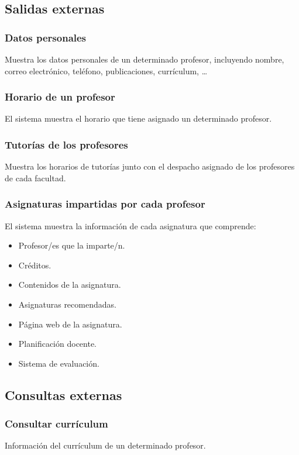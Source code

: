 \documentclass[11pt,a4paper,spanish,twoside]{book}
\begin{document}
\subsection{Salidas externas}
\subsubsection{Datos personales}
Muestra los datos personales de un determinado profesor, incluyendo
nombre, correo electrónico, teléfono, publicaciones, currículum, \dots

\subsubsection{Horario de un profesor}
El sistema muestra el horario que tiene asignado un determinado profesor.

\subsubsection{Tutorías de los profesores} 
Muestra los horarios de tutorías junto con el despacho asignado de los
profesores de cada facultad.
 
\subsubsection{Asignaturas impartidas por cada profesor}
El sistema muestra la información de cada asignatura que comprende:
\begin{itemize}
\item Profesor/es que la imparte/n.
\item Créditos.
\item Contenidos de la asignatura.
\item Asignaturas recomendadas.
\item Página web de la asignatura.
\item Planificación docente.
\item Sistema de evaluación.
\end{itemize}

\subsection{Consultas externas}
\subsubsection{Consultar currículum}
Información del currículum de un determinado profesor.
\end{document}
